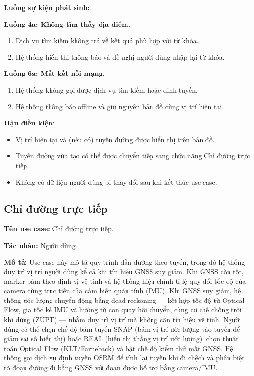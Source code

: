\documentclass[../DoAn.tex]{subfiles}
\begin{document}
\textbf{Luồng sự kiện phát sinh:}

\textbf{Luồng 4a: Không tìm thấy địa điểm.}
\begin{enumerate}[label=4a.\arabic*., leftmargin=2.6em, align=left, labelsep=0.5em]
    \item Dịch vụ tìm kiếm không trả về kết quả phù hợp với từ khóa.
    \item Hệ thống hiển thị thông báo và đề nghị người dùng nhập lại từ khóa.
\end{enumerate}

\textbf{Luồng 6a: Mất kết nối mạng.}
\begin{enumerate}[label=6a.\arabic*., leftmargin=2.6em, align=left, labelsep=0.5em]
    \item Hệ thống không gọi được dịch vụ tìm kiếm hoặc định tuyến.
    \item Hệ thống thông báo offline và giữ nguyên bản đồ cùng vị trí hiện tại.
\end{enumerate}

\textbf{Hậu điều kiện:}
\begin{itemize}
    \item Vị trí hiện tại và (nếu có) tuyến đường được hiển thị trên bản đồ.
    \item Tuyến đường vừa tạo có thể được chuyển tiếp sang chức năng Chỉ đường trực tiếp.
    \item Không có dữ liệu người dùng bị thay đổi sau khi kết thúc use case.
\end{itemize}

\subsection{Chỉ đường trực tiếp}
\label{subsection:2.3.2}
\textbf{Tên use case:} Chỉ đường trực tiếp.

\textbf{Tác nhân:} Người dùng.

\textbf{Mô tả:} Use case này mô tả quy trình dẫn đường theo tuyến, trong đó hệ thống duy trì vị trí người dùng kể cả khi tín hiệu GNSS suy giảm. Khi GNSS còn tốt, marker bám theo định vị vệ tinh và hệ thống hiệu chỉnh tỉ lệ quy đổi tốc độ của camera cùng trục tiến của cảm biến quán tính (IMU). Khi GNSS suy giảm, hệ thống ước lượng chuyển động bằng dead reckoning --- kết hợp tốc độ từ Optical Flow, gia tốc kế IMU và hướng từ con quay hồi chuyển, cùng cơ chế chống trôi khi dừng (ZUPT) --- nhằm duy trì vị trí mà không cần tín hiệu vệ tinh. Người dùng có thể chọn chế độ bám tuyến SNAP (bám vị trí ước lượng vào tuyến để giảm sai số hiển thị) hoặc REAL (hiển thị thẳng vị trí ước lượng), chọn thuật toán Optical Flow (KLT/Farneback) và bật chế độ kiểm thử mất GNSS. Hệ thống gọi dịch vụ định tuyến OSRM để tính lại tuyến khi đi chệch và phân biệt rõ đoạn đường đi bằng GNSS với đoạn được hỗ trợ bằng camera/IMU.
\end{document}
